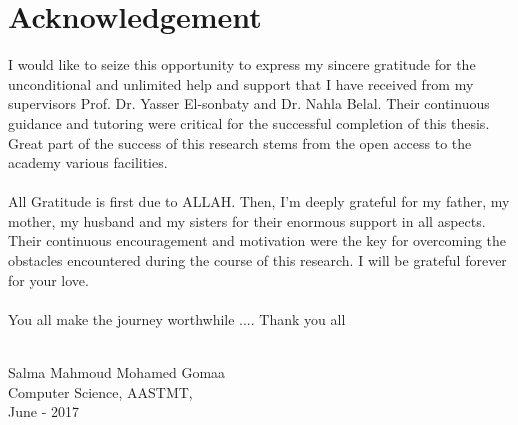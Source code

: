 \documentclass[12pt,openany]{llncs}
\begin{document}
\clearpage\thispagestyle{empty}
\section*{Acknowledgement}

I would like to seize this opportunity to express my sincere gratitude for the
unconditional and unlimited help and support that I have received from my supervisors Prof.
Dr. Yasser El-sonbaty and Dr. Nahla Belal. Their continuous guidance and tutoring were
critical for the successful completion of this thesis. Great part of the success of this research stems from the open access to the academy various facilities. 
\\
\\
All Gratitude is first due to ALLAH. Then, I'm deeply grateful for my father, my mother, my husband and my sisters for their enormous support in all aspects. Their continuous encouragement and motivation were the key for overcoming the obstacles encountered during the course of this research. I will be grateful forever for your love.
\\
\\
You all make the journey worthwhile .... Thank you all
\\
\\
\begin{flushright}
Salma Mahmoud Mohamed Gomaa\\
Computer Science, AASTMT,\\
June - 2017
\end{flushright}

\newpage
\tableofcontents
\newpage
\listoffigures
\newpage
\listoftables
\newpage
\end{document}
